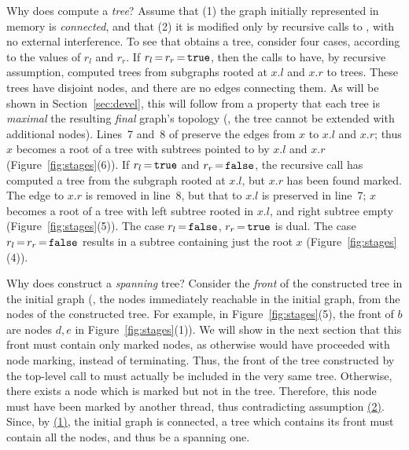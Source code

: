 Why does  compute a {\em tree}? Assume that
\hypertarget{asm1}{{(1)}} the graph initially represented in memory is
{\em connected}, and that \hypertarget{asm2}{{(2)}} it is modified
only by recursive calls to , with no external
interference. To see that  obtains a tree, consider four
cases, according to the values of $r_l$ and $r_r$. If
$r_l\,{=}\,r_r\,{=}\,\mathtt{\small{true}}$, then the calls to
 have, by recursive assumption, computed trees from
subgraphs rooted at $x.l$ and $x.r$ to trees. These trees have
disjoint nodes, and there are no edges connecting them. As will be
shown in Section~\ref{sec:devel}, this will follow from a property
that each tree is {\em maximal} \wrt the resulting \emph{final}
graph's topology (\ie, the tree cannot be extended with additional
nodes).  Lines~7 and~8 of  preserve the edges from $x$ to
$x.l$ and $x.r$; thus $x$ becomes a root of a tree with subtrees
pointed to by $x.l$ and $x.r$ (Figure~\ref{fig:stages}(6)). If
$r_l\,{=}\,\mathtt{\small{true}}$ and
$r_r\,{=}\,\mathtt{\small{false}}$, the recursive call has computed a
tree from the subgraph rooted at $x.l$, but $x.r$ has been found
marked. The edge to $x.r$ is removed in line~8, but that to $x.l$ is
preserved in line~7; $x$ becomes a root of a tree with left subtree
rooted in $x.l$, and right subtree empty
(Figure~\ref{fig:stages}(5)). The case
$r_l\,{=}\,\mathtt{\small{false}}$, $r_r\,{=}\,\mathtt{\small{true}}$
is dual. The case $r_l\,{=}\,r_r\,{=}\,\mathtt{\small{false}}$ results
in a subtree containing just the root $x$
(Figure~\ref{fig:stages}(4)).

Why does  construct a \emph{spanning} tree? Consider the
{\em front} of the constructed tree in the initial graph (\ie, the
nodes immediately reachable in the initial graph, from the nodes of
the constructed tree. For example, in Figure~\ref{fig:stages}(5), the
front of $b$ are nodes $d, e$ in Figure~\ref{fig:stages}(1)). We will
show in the next section that this front must contain only marked
nodes, as otherwise  would have proceeded with node
marking, instead of terminating. Thus, the front of the tree
constructed by the top-level call to  must actually be
included in the very same tree. Otherwise, there exists a node which
is marked but not in the tree. Therefore, this node must have been
marked by another thread, thus contradicting assumption
\hyperlink{asm2}{(2)}. Since, by \hyperlink{asm1}{(1)}, the initial
graph is connected, a tree which contains its front must contain all
the nodes, and thus be a spanning one.

